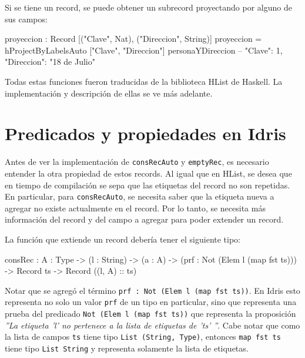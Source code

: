 
Si se tiene un record, se puede obtener un subrecord proyectando por alguno de sus campos:

\begin{code}
proyeccion : Record [("Clave", Nat), ("Direccion", String)]
proyeccion = hProjectByLabelsAuto ["Clave", "Direccion"]
  personaYDireccion
-- { "Clave": 1, "Direccion": "18 de Julio" }
\end{code}

Todas estas funciones fueron traducidas de la biblioteca HList de Haskell. La implementación y descripción de ellas se ve más adelante.

\section{Predicados y propiedades en Idris}

Antes de ver la implementación de \texttt{consRecAuto} y \texttt{emptyRec}, es necesario entender la otra propiedad de estos records. Al igual que en HList, se desea que en tiempo de compilación se sepa que las etiquetas del record no son repetidas. En particular, para \texttt{consRecAuto}, se necesita saber que la etiqueta nueva a agregar no existe actualmente en el record. Por lo tanto, se necesita más información del record y del campo a agregar para poder extender un record.

La función que extiende un record debería tener el siguiente tipo:

\begin{code}
consRec : {A : Type} -> (l : String) -> (a : A) ->
  (prf : Not (Elem l (map fst ts))) -> Record ts -> 
  Record ((l, A) :: ts)
\end{code}

Notar que se agregó el término \texttt{prf : Not (Elem l (map fst ts))}. En Idris esto representa no solo un valor \texttt{prf} de un tipo en particular, sino que representa una prueba del predicado \texttt{Not (Elem l (map fst ts))} que representa la proposición \textit{''La etiqueta 'l' no pertenece a la lista de etiquetas de 'ts' ''}. Cabe notar que como la lista de campos \texttt{ts} tiene tipo \texttt{List (String, Type)}, entonces \texttt{map fst ts} tiene tipo \texttt{List String} y representa solamente la lista de etiquetas.

